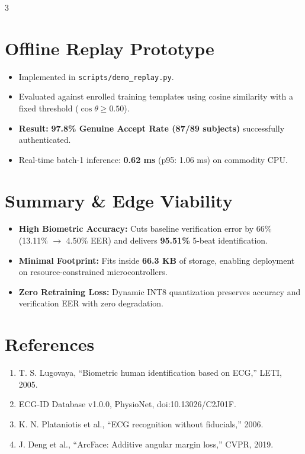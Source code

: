 \documentclass{article}
\begin{document}
\begin{multicols}{3}
\section*{\color{primary} Offline Replay Prototype}
\begin{itemize}
    \item Implemented in \texttt{scripts/demo\_replay.py}.
    \item Evaluated against enrolled training templates using cosine similarity with a fixed threshold ($\cos \theta \ge 0.50$).
    \item \textbf{Result:} \textbf{97.8\% Genuine Accept Rate (87/89 subjects)} successfully authenticated.
    \item Real-time batch-1 inference: \textbf{0.62 ms} (p95: 1.06 ms) on commodity CPU.
\end{itemize}

\section*{\color{primary} Summary \& Edge Viability}
\begin{itemize}
    \item \textbf{High Biometric Accuracy:} Cuts baseline verification error by 66\% (13.11\% $\to$ 4.50\% EER) and delivers \textbf{95.51\%} 5-beat identification.
    \item \textbf{Minimal Footprint:} Fits inside \textbf{66.3 KB} of storage, enabling deployment on resource-constrained microcontrollers.
    \item \textbf{Zero Retraining Loss:} Dynamic INT8 quantization preserves accuracy and verification EER with zero degradation.
\end{itemize}

\section*{\color{primary} References}
\begin{enumerate}\small
    \item T. S. Lugovaya, ``Biometric human identification based on ECG,'' LETI, 2005.
    \item ECG-ID Database v1.0.0, PhysioNet, doi:10.13026/C2J01F.
    \item K. N. Plataniotis et al., ``ECG recognition without fiducials,'' 2006.
    \item J. Deng et al., ``ArcFace: Additive angular margin loss,'' CVPR, 2019.
\end{enumerate}

\end{multicols}
\end{document}
